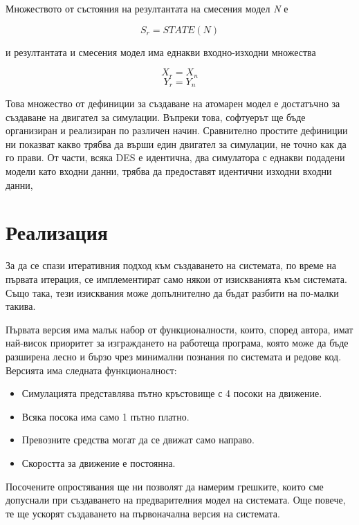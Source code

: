 		\noindent Множеството от състояния на резултантата на смесения модел \emph{N} е
		
		\begin{equation}
			S_r = STATE(N)
		\end{equation}
		
		\noindent и резултантата и смесения модел има еднакви входно-изходни множества
		
		\begin{equation}
			X_r = X_n
		\end{equation}		
		\begin{equation}
			Y_r = Y_n
		\end{equation}
		
		Това множество от дефиниции за създаване на атомарен модел е достатъчно
		за създаване на двигател за симулации. Въпреки това, софтуерът ще бъде
		организиран и реализиран по различен начин. Сравнително простите
		дефиниции ни показват какво трябва да върши един двигател за симулации,
		не точно как да го прави. От части, всяка \ac{DES} е идентична, два
		симулатора с еднакви подадени модели като входни данни, трябва да
		предоставят идентични изходни входни данни,
					
\section{Реализация}

	За да се спази итеративния подход към създаването на системата,
	по време на първата итерация, се имплементират само някои от изискванията към системата. 
	Също така, тези изисквания може допълнително да бъдат разбити на по-малки такива.
	
	Първата версия има малък набор от функционалности, които, според автора, имат най-висок приоритет за
	изграждането на работеща програма, която може да бъде разширена лесно и бързо
	чрез минимални познания по системата и редове код.
	Версията има следната функционалност:
	\begin{itemize}
		\item Симулацията представлява пътно кръстовище с 4 посоки на движение.
		\item Всяка посока има само 1 пътно платно.
		\item Превозните средства могат да се движат само направо.
		\item Скоростта за движение е постоянна.
	\end{itemize}
	
	Посочените опростявания ще ни позволят да намерим грешките, които сме допуснали
	при създаването на предварителния модел на системата. Още повече, 
	те ще ускорят създаването на първоначална версия на системата.
	
